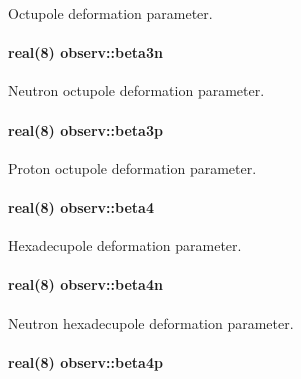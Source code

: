 Octupole deformation parameter. 

\paragraph[{\texorpdfstring{beta3n}{beta3n}}]{\setlength{\rightskip}{0pt plus 5cm}real(8) observ\+::beta3n}\hypertarget{namespaceobserv_af0eb489826da64a5a3eff551c79d7eb0}{}\label{namespaceobserv_af0eb489826da64a5a3eff551c79d7eb0}


Neutron octupole deformation parameter. 

\paragraph[{\texorpdfstring{beta3p}{beta3p}}]{\setlength{\rightskip}{0pt plus 5cm}real(8) observ\+::beta3p}\hypertarget{namespaceobserv_a07b229432fc572292d89fdad0b982e2f}{}\label{namespaceobserv_a07b229432fc572292d89fdad0b982e2f}


Proton octupole deformation parameter. 

\paragraph[{\texorpdfstring{beta4}{beta4}}]{\setlength{\rightskip}{0pt plus 5cm}real(8) observ\+::beta4}\hypertarget{namespaceobserv_a47b1c6dbefba99b8eeeeb876d0cb626e}{}\label{namespaceobserv_a47b1c6dbefba99b8eeeeb876d0cb626e}


Hexadecupole deformation parameter. 

\paragraph[{\texorpdfstring{beta4n}{beta4n}}]{\setlength{\rightskip}{0pt plus 5cm}real(8) observ\+::beta4n}\hypertarget{namespaceobserv_a71725cf0728a327f5bc7585186708af7}{}\label{namespaceobserv_a71725cf0728a327f5bc7585186708af7}


Neutron hexadecupole deformation parameter. 

\paragraph[{\texorpdfstring{beta4p}{beta4p}}]{\setlength{\rightskip}{0pt plus 5cm}real(8) observ\+::beta4p}\hypertarget{namespaceobserv_a60ae9f4bd6411b61020690536d5d0c9d}{}\label{namespaceobserv_a60ae9f4bd6411b61020690536d5d0c9d}


